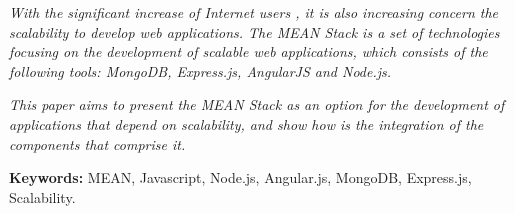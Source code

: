 \textit{With the significant increase of Internet users \cite{intStats}, it is also increasing concern the scalability to develop web applications. The MEAN Stack is a set of technologies focusing on the development of scalable web applications, which consists of the following tools: MongoDB, Express.js, AngularJS and Node.js.}

\textit{This paper aims to present the MEAN Stack as an option for the development of applications that depend on scalability, and show how is the integration of the components that comprise it.}

\textbf{Keywords:} MEAN, Javascript, Node.js, Angular.js, MongoDB, Express.js, Scalability.